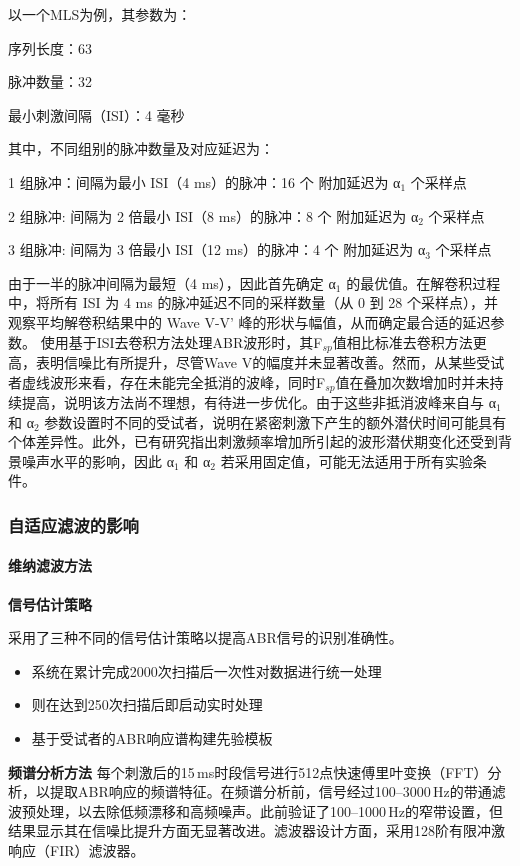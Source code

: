 以一个MLS为例，其参数为：

序列长度：63

脉冲数量：32

最小刺激间隔（ISI）：4 毫秒

其中，不同组别的脉冲数量及对应延迟为：

1 组脉冲：间隔为最小 ISI（4 ms）的脉冲：16 个 附加延迟为 α$_{1}$ 个采样点

2 组脉冲: 间隔为 2 倍最小 ISI（8 ms）的脉冲：8 个 附加延迟为 α$_{2}$  个采样点

3 组脉冲: 间隔为 3 倍最小 ISI（12 ms）的脉冲：4 个 附加延迟为 α$_{3}$  个采样点

由于一半的脉冲间隔为最短（4 ms），因此首先确定 α$_{1}$ 的最优值。在解卷积过程中，将所有 ISI 为 4 ms 的脉冲延迟不同的采样数量（从 0 到 28 个采样点），并观察平均解卷积结果中的 Wave V-V’ 峰的形状与幅值，从而确定最合适的延迟参数。
使用基于ISI去卷积方法处理ABR波形时，其F$_{sp}$值相比标准去卷积方法更高，表明信噪比有所提升，尽管Wave V的幅度并未显著改善。然而，从某些受试者虚线波形来看，存在未能完全抵消的波峰，同时F$_{sp}$值在叠加次数增加时并未持续提高，说明该方法尚不理想，有待进一步优化。由于这些非抵消波峰来自与 α$_{1}$ 和 α$_{2}$ 参数设置时不同的受试者，说明在紧密刺激下产生的额外潜伏时间可能具有个体差异性。此外，已有研究指出刺激频率增加所引起的波形潜伏期变化还受到背景噪声水平的影响，因此 α$_{1}$ 和 α$_{2}$ 若采用固定值，可能无法适用于所有实验条件。

\subsubsection{自适应滤波的影响}
\paragraph*{维纳滤波方法}
\textbf{信号估计策略}

采用了三种不同的信号估计策略以提高ABR信号的识别准确性。
\begin{itemize}
\item 系统在累计完成2000次扫描后一次性对数据进行统一处理
\item 则在达到250次扫描后即启动实时处理
\item 基于受试者的ABR响应谱构建先验模板
\end{itemize}
\textbf*{频谱分析方法}
每个刺激后的15\,ms时段信号进行512点快速傅里叶变换（FFT）分析，以提取ABR响应的频谱特征。在频谱分析前，信号经过100–3000\,Hz的带通滤波预处理，以去除低频漂移和高频噪声。此前验证了100–1000\,Hz的窄带设置，但结果显示其在信噪比提升方面无显著改进。滤波器设计方面，采用128阶有限冲激响应（FIR）滤波器。

